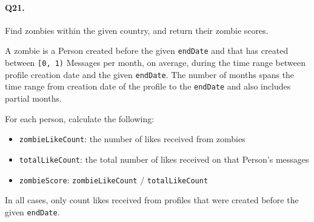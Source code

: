 \paragraph{Q21.}

Find zombies within the given country, and return their zombie scores.

A zombie is a Person created before the given \texttt{endDate} and that
has created between \texttt{{[}0,\ 1)} Messages per month, on average,
during the time range between profile creation date and the given
\texttt{endDate}. The number of months spans the time range from
creation date of the profile to the \texttt{endDate} and also includes
partial months.

For each person, calculate the following:

\begin{itemize}
\tightlist
\item
  \texttt{zombieLikeCount}: the number of likes received from zombies
\item
  \texttt{totalLikeCount}: the total number of likes received on that
  Person's messages
\item
  \texttt{zombieScore}: \texttt{zombieLikeCount} /
  \texttt{totalLikeCount}
\end{itemize}

In all cases, only count likes received from profiles that were created
before the given \texttt{endDate}.
